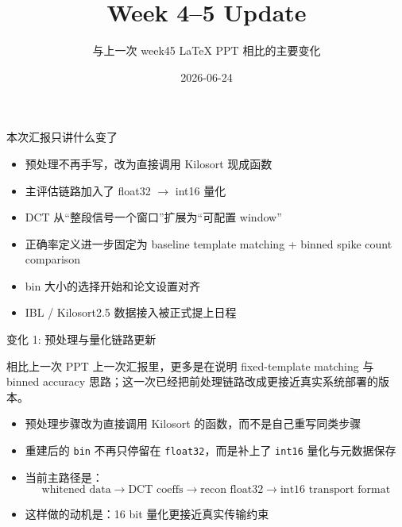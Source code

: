 \documentclass[aspectratio=169,11pt]{beamer}
\title{Week 4--5 Update}
\subtitle{与上一次 week45 LaTeX PPT 相比的主要变化}
\author{}
\date{2026-06-24}
\begin{document}
\begin{frame}
  \titlepage
\end{frame}

\begin{frame}{本次汇报只讲什么变了}
  \begin{itemize}
    \item 预处理不再手写，改为直接调用 Kilosort 现成函数
    \item 主评估链路加入了 \alert{float32 $\rightarrow$ int16} 量化
    \item DCT 从“整段信号一个窗口”扩展为“可配置 window”
    \item 正确率定义进一步固定为 \alert{baseline template matching + binned spike count comparison}
    \item bin 大小的选择开始和论文设置对齐
    \item IBL / Kilosort2.5 数据接入被正式提上日程
  \end{itemize}
\end{frame}

\begin{frame}{变化 1: 预处理与量化链路更新}
  \begin{block}{相比上一次 PPT}
    上一次汇报里，更多是在说明 fixed-template matching 与 binned accuracy 思路；这一次已经把前处理链路改成更接近真实系统部署的版本。
  \end{block}
  \begin{itemize}
    \item 预处理步骤改为直接调用 Kilosort 的函数，而不是自己重写同类步骤
    \item 重建后的 \texttt{bin} 不再只停留在 \texttt{float32}，而是补上了 \texttt{int16} 量化与元数据保存
    \item 当前主路径是：
    \[
      \text{whitened data} \rightarrow \text{DCT coeffs} \rightarrow \text{recon float32} \rightarrow \text{int16 transport format}
    \]
    \item 这样做的动机是：\alert{16 bit 量化更接近真实传输约束}
  \end{itemize}
\end{frame}
\end{document}
